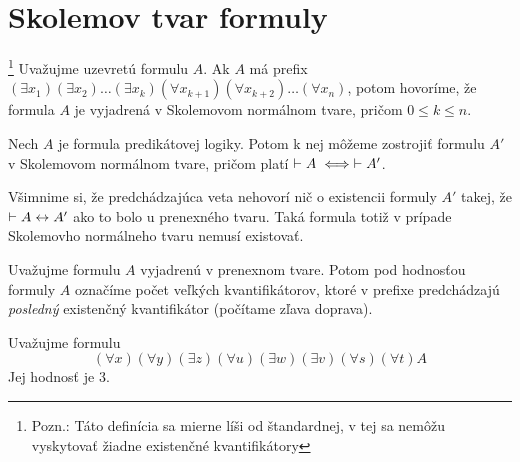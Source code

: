 \section{Skolemov tvar formuly}

\begin{definicia}$\!\!\!$\footnote{Pozn.:
    Táto definícia sa mierne líši od štandardnej, v tej sa nemôžu
    vyskytovať žiadne existenčné kvantifikátory
    }
  Uvažujme uzevretú formulu $A$.
  Ak $A$ má prefix $(\exists x_1)(\exists x_2) \dots (\exists x_k)
    (\forall x_{k+1}) (\forall x_{k+2}) \dots (\forall x_n)$, potom 
    hovoríme, že formula $A$ je vyjadrená v Skolemovom normálnom
    tvare, pričom $0 \le k \le n$.
\end{definicia}

\begin{veta}
    Nech $A$ je formula predikátovej logiky. Potom k nej môžeme
    zostrojiť formulu $A'$ v Skolemovom normálnom tvare, pričom platí
    $\vdash A \iff \vdash A'$.
    \label{veta:skolem}
\end{veta}

\begin{poznamka}
    Všimnime si, že predchádzajúca veta nehovorí nič o existencii
    formuly $A'$ takej, že $\vdash A \leftrightarrow A'$ ako to
    bolo u prenexného tvaru. Taká formula totiž v prípade Skolemovho
    normálneho tvaru nemusí existovať.
\end{poznamka}

\begin{definicia}
    Uvažujme formulu $A$ vyjadrenú v prenexnom tvare. Potom pod
    hodnosťou formuly $A$ označíme počet veľkých kvantifikátorov,
    ktoré v prefixe predchádzajú \emph{posledný} existenčný
    kvantifikátor (počítame zľava doprava).
\end{definicia}

\begin{priklad}
    Uvažujme formulu
    \begin{equation*}
        (\forall x) (\forall y) (\exists z) 
        (\forall u) (\exists w) (\exists v)
        (\forall s) (\forall t) A
    \end{equation*}
    Jej hodnosť je 3.
\end{priklad}

\def\existsxton{(\exists x_1) (\exists x_2) \dots (\exists x_n)}
\def\forallxton{(\forall x_1) (\forall x_2) \dots (\forall x_n)}


